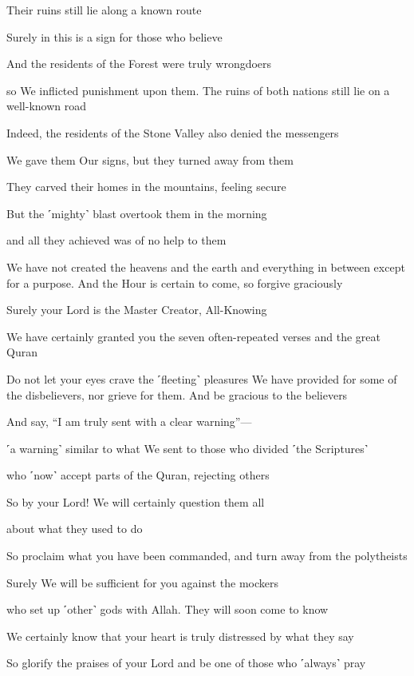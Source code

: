 Their ruins still lie along a known route

Surely in this is a sign for those who believe

And the residents of the Forest were truly wrongdoers

so We inflicted punishment upon them. The ruins of both nations still lie on a well-known road

Indeed, the residents of the Stone Valley also denied the messengers

We gave them Our signs, but they turned away from them

They carved their homes in the mountains, feeling secure

But the ˹mighty˺ blast overtook them in the morning

and all they achieved was of no help to them

We have not created the heavens and the earth and everything in between except for a purpose. And the Hour is certain to come, so forgive graciously

Surely your Lord is the Master Creator, All-Knowing

We have certainly granted you the seven often-repeated verses and the great Quran

Do not let your eyes crave the ˹fleeting˺ pleasures We have provided for some of the disbelievers, nor grieve for them. And be gracious to the believers

And say, “I am truly sent with a clear warning”—

˹a warning˺ similar to what We sent to those who divided ˹the Scriptures˺

who ˹now˺ accept parts of the Quran, rejecting others

So by your Lord! We will certainly question them all

about what they used to do

So proclaim what you have been commanded, and turn away from the polytheists

Surely We will be sufficient for you against the mockers

who set up ˹other˺ gods with Allah. They will soon come to know

We certainly know that your heart is truly distressed by what they say

So glorify the praises of your Lord and be one of those who ˹always˺ pray

